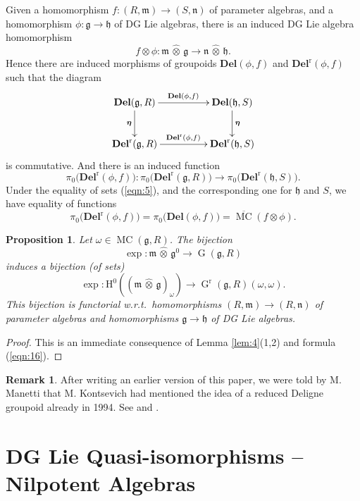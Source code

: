 \documentclass[a4paper,10pt]{amsart}
\newtheorem{prop}[equation]{Proposition}
\theoremstyle{definition}
\newtheorem{rem}[equation]{Remark}
\numberwithin{equation}{section}
\newcommand{\opn}{\operatorname}
\newcommand{\ol}{\overline}
\newcommand{\mfrak}[1]{\mathfrak{#1}}
\newcommand{\mbf}[1]{\mathbf{#1}}
\newcommand{\mrm}[1]{\mathrm{#1}}
\newcommand{\tup}[1]{\textup{#1}}
\newcommand{\bsym}[1]{\boldsymbol{#1}}
\newcommand{\what}[1]{\widehat{#1}}
\newcommand{\hatotimes}{\, \what{\otimes} \,}
\newcommand{\hot}{\hatotimes}
\newcommand{\g}{\mfrak{g}}
\newcommand{\m}{\mfrak{m}}
\newcommand{\h}{\mfrak{h}}
\newcommand{\n}{\mfrak{n}}
\newcommand{\om}{\omega}
\begin{document}
Given a homomorphism $f : (R, \m) \to (S, \n)$ of parameter algebras, and a
homomorphism 
$\phi : \g \to \h$ of DG Lie algebras, there is an induced 
DG Lie algebra homomorphism 
\[ f \otimes \phi : \m \hatotimes \g \to \n \hatotimes \h . \]
Hence there are induced morphisms of groupoids 
$\mbf{Del}(\phi, f)$ and $\mbf{Del}^{\mrm{r}}(\phi, f)$
such that the diagram 
\[ \UseTips \xymatrix @C=11ex @R=6ex {
\mbf{Del}(\g, R)
\ar[r]^{\mbf{Del}(\phi, f)}
\ar[d]_{\bsym{\eta}}
&
\mbf{Del}(\h, S)
\ar[d]^{\bsym{\eta}}
\\
\mbf{Del}^{\mrm{r}}(\g, R)
\ar[r]^{\mbf{Del}^{\mrm{r}}(\phi, f)}
&
\mbf{Del}^{\mrm{r}}(\h, S) 
} \]
is commutative. And there is an induced function 
\[ \pi_0 \bigl( \mbf{Del}^{\mrm{r}}(\phi, f) \bigr) :
\pi_0 \bigl( \mbf{Del}^{\mrm{r}}(\g, R) \bigr) \to 
\pi_0 \bigl( \mbf{Del}^{\mrm{r}}(\h, S) \bigr) . \]
Under the equality of sets (\ref{eqn:5}), and the corresponding one for 
$\h$ and $S$, we have equality of functions
\begin{equation} \label{eqn:18}
\pi_0 \bigl( \mbf{Del}^{\mrm{r}}(\phi, f) \bigr) =
\pi_0 \bigl( \mbf{Del}(\phi, f) \bigr) =
\ol{\opn{MC}}(f \otimes \phi) . 
\end{equation}

\begin{prop} \label{prop:2}
Let $\om \in \opn{MC}(\g, R)$. 
The bijection 
\[ \exp : \m \hot \g^0 \to  \opn{G}(\g, R) \] 
induces a bijection \tup{(}of sets\tup{)}
\[ \exp : \mrm{H}^0( (\m \hot \g)_{\om} ) \to 
\opn{G}^{\mrm{r}}(\g, R)(\om, \om) . \]
This bijection is functorial w.r.t.\ homomorphisms $(R, \m) \to (R, \n)$ of
parameter algebras and homomorphisms $\g \to \h$ of DG Lie algebras.
\end{prop}

\begin{proof}
This is an immediate consequence of Lemma \ref{lem:4}(1,2) and formula 
(\ref{eqn:16}).
\end{proof}

\begin{rem}
After writing an earlier version of this paper, we were told by M. Manetti that
M. Kontsevich had mentioned the idea of a reduced Deligne groupoid already in
1994. See \cite[page 19]{Ko1} and \cite{Mt}.
\end{rem}





\section{DG Lie Quasi-isomorphisms -- Nilpotent Algebras}
\label{sec:dg-quasi-nilp}
\end{document}
